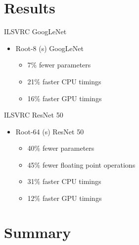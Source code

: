 \documentclass[t,xcolor=dvipsnames]{beamer}
\begin{document}
\section*{Results}

%
%

%
\begin{frame}{ILSVRC GoogLeNet}
%

\begin{itemize}
    \item Root-8 (s) GoogLeNet
    \begin{itemize}
        \item 7\% fewer parameters 
        \item 21\% faster CPU timings
        \item 16\% faster GPU timings
    \end{itemize}
\end{itemize}

\end{frame}

%
\begin{frame}{ILSVRC ResNet 50}

%
\begin{itemize}
\item Root-64 (s) ResNet 50
    \begin{itemize}
        \item 40\% fewer parameters
        \item 45\% fewer floating point operations
        \item 31\% faster CPU timings
        \item 12\% faster GPU timings
    \end{itemize}
\end{itemize}

\end{frame}

\section*{Summary}
\end{document}
